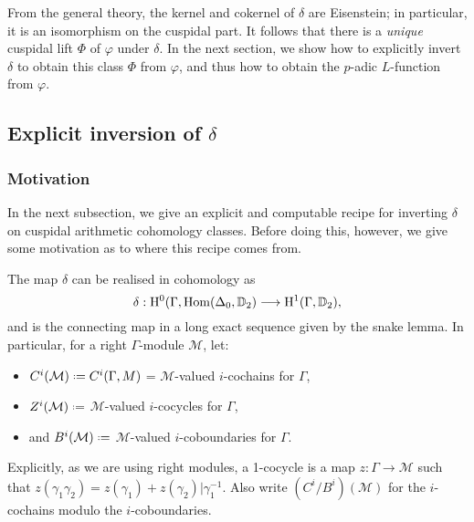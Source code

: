 \documentclass[a4paper,10pt]{article}
\numberwithin{equation}{section}
\begin{document}
From the general theory, the kernel and cokernel of $\delta$ are Eisenstein; in particular, it is an isomorphism on the cuspidal part. It follows that there is a \emph{unique} cuspidal lift $\Phi$ of $\varphi$ under $\delta$. In the next section, we show how to explicitly invert $\delta$ to obtain this class $\Phi$ from $\varphi$, and thus how to obtain the $p$-adic $L$-function from $\varphi$.



\subsection{Explicit inversion of $\delta$}

\subsubsection{Motivation}
In the next subsection, we give an explicit and computable recipe for inverting $\delta$ on cuspidal arithmetic cohomology classes. Before doing this, however, we give some motivation as to where this recipe comes from. 

The map $\delta$ can be realised in cohomology as 
\[
\delta : \mathrm{H}^0(\Gamma,\mathrm{Hom}(\Delta_0,\mathbb{D}_2) \longrightarrow \mathrm{H}^1(\Gamma,\mathbb{D}_2),
\]
and is the connecting map in a long exact sequence given by the snake lemma. In particular, for a right $\Gamma$-module $\mathcal{M}$, let:
\begin{itemize}
	\item $C^i(\mathcal{M}) \defeq C^i(\Gamma,M)$ = $\mathcal{M}$-valued $i$-cochains for $\Gamma$,
	\item $Z^i(\mathcal{M}) \defeq$ $\mathcal{M}$-valued $i$-cocycles for $\Gamma$,
	\item and $B^i(\mathcal{M}) \defeq$ $\mathcal{M}$-valued $i$-coboundaries for $\Gamma$. 
\end{itemize}
Explicitly, as we are using right modules, a 1-cocycle is a map $z : \Gamma \to \mathcal{M}$ such that $z(\gamma_1\gamma_2) = z(\gamma_1) + z(\gamma_2)|\gamma_1^{-1}$. Also write $(C^i/B^i)(\mathcal{M})$ for the $i$-cochains modulo the $i$-coboundaries.
\end{document}
